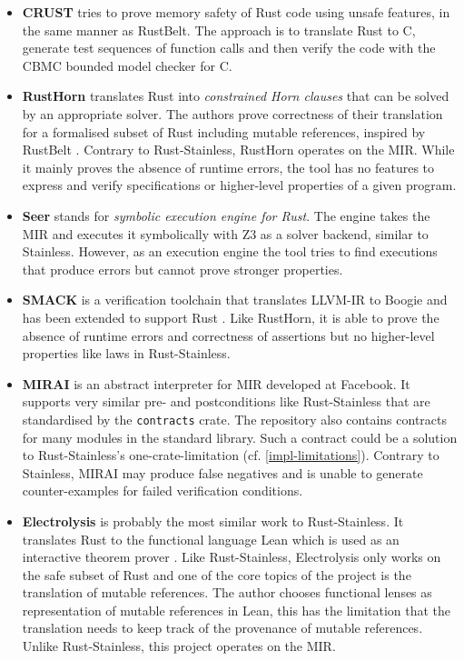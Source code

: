 \begin{itemize}

\item \textbf{CRUST} \cite{crust} tries to prove memory safety of Rust code
using unsafe features, in the same manner as RustBelt. The approach is to
translate Rust to C, generate test sequences of function calls and then verify
the code with the CBMC bounded model checker for C.

\item \textbf{RustHorn} \cite{rusthorn} translates Rust into \emph{constrained
Horn clauses} that can be solved by an appropriate solver. The authors prove
correctness of their translation for a formalised subset of Rust including
mutable references, inspired by RustBelt \cite{rustbelt}. Contrary to
Rust-Stainless, RustHorn operates on the MIR. While it mainly proves the absence
of runtime errors, the tool has no features to  express and verify
specifications or higher-level properties of a given program.

\item \textbf{Seer} \cite{seer} stands for \emph{symbolic execution engine for
Rust}. The engine takes the MIR and executes it symbolically with Z3 \cite{z3}
as a solver backend, similar to Stainless. However, as an execution engine the
tool tries to find executions that produce errors but cannot prove stronger
properties.

\item \textbf{SMACK} is a verification toolchain that translates LLVM-IR to
Boogie \cite{boogie} and  has been extended to support Rust \cite{smack}. Like
RustHorn, it is able to prove the absence of runtime errors and correctness of
assertions but no higher-level properties like laws in Rust-Stainless.

\item \textbf{MIRAI} \cite{mirai} is an abstract interpreter for MIR developed
at Facebook. It supports very similar pre- and postconditions like
Rust-Stainless that are standardised by the \lstinline!contracts! crate. The
repository also contains contracts for many modules in the standard library.
Such a contract could be a solution to Rust-Stainless's one-crate-limitation (cf.
\autoref{impl-limitations}).  Contrary to Stainless, MIRAI may produce false
negatives and  is unable to generate counter-examples for failed verification
conditions.

\item \textbf{Electrolysis} \cite{electrolysis} is probably the most similar
work to Rust-Stainless. It translates Rust to the functional language Lean which
is used as an interactive theorem prover \cite{lean}. Like Rust-Stainless,
Electrolysis only works on the safe subset of Rust and one of the core topics of
the project is the translation of mutable references. The author chooses
functional lenses as representation of mutable references in Lean, this has the
limitation that the translation needs to keep track of the provenance of mutable
references. Unlike Rust-Stainless, this project operates on the MIR.



\end{itemize}
